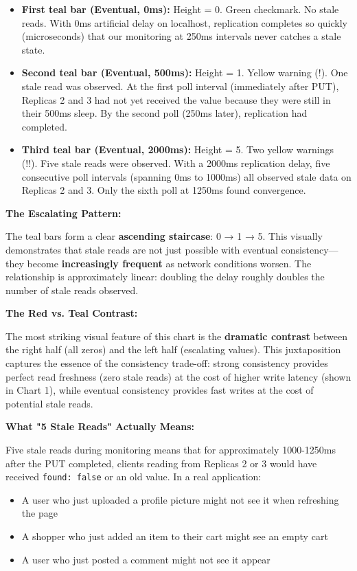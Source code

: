 \documentclass[10pt,a4paper]{article}
\begin{document}
\begin{itemize}
    \item \textbf{First teal bar (Eventual, 0ms):} Height = 0. Green checkmark. No stale reads. With 0ms artificial delay on localhost, replication completes so quickly (microseconds) that our monitoring at 250ms intervals never catches a stale state.
    
    \item \textbf{Second teal bar (Eventual, 500ms):} Height = 1. Yellow warning (!). One stale read was observed. At the first poll interval (immediately after PUT), Replicas 2 and 3 had not yet received the value because they were still in their 500ms sleep. By the second poll (250ms later), replication had completed.
    
    \item \textbf{Third teal bar (Eventual, 2000ms):} Height = 5. Two yellow warnings (!!). Five stale reads were observed. With a 2000ms replication delay, five consecutive poll intervals (spanning 0ms to 1000ms) all observed stale data on Replicas 2 and 3. Only the sixth poll at 1250ms found convergence.
\end{itemize}

\textbf{The Escalating Pattern:}

The teal bars form a clear \textbf{ascending staircase}: 0 → 1 → 5. This visually demonstrates that stale reads are not just possible with eventual consistency---they become \textbf{increasingly frequent} as network conditions worsen. The relationship is approximately linear: doubling the delay roughly doubles the number of stale reads observed.

\textbf{The Red vs. Teal Contrast:}

The most striking visual feature of this chart is the \textbf{dramatic contrast} between the right half (all zeros) and the left half (escalating values). This juxtaposition captures the essence of the consistency trade-off: strong consistency provides perfect read freshness (zero stale reads) at the cost of higher write latency (shown in Chart 1), while eventual consistency provides fast writes at the cost of potential stale reads.

\textbf{What "5 Stale Reads" Actually Means:}

Five stale reads during monitoring means that for approximately 1000-1250ms after the PUT completed, clients reading from Replicas 2 or 3 would have received \texttt{found: false} or an old value. In a real application:
\begin{itemize}
    \item A user who just uploaded a profile picture might not see it when refreshing the page
    \item A shopper who just added an item to their cart might see an empty cart
    \item A user who just posted a comment might not see it appear
\end{itemize}
\end{document}
